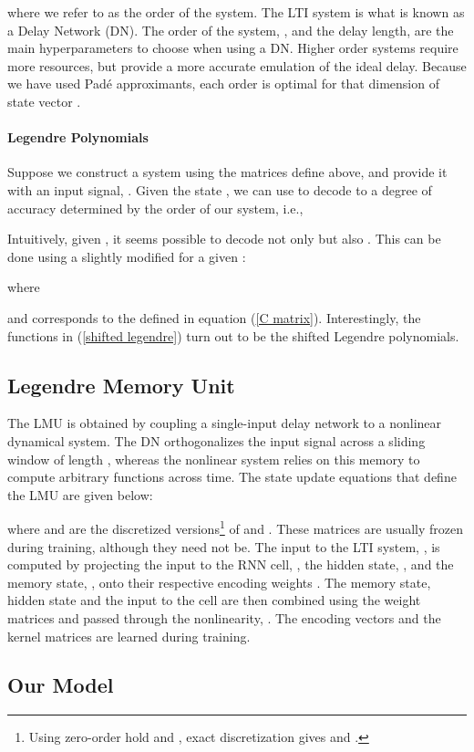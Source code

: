 \documentclass{article}
\begin{document}
where we refer to  as the order of the system. The LTI system  is what is known as a Delay Network (DN). The order of the system, , and the delay length,  are the main hyperparameters to choose when using a DN. Higher order systems require more resources, but provide a more accurate emulation of the ideal delay. Because we have used Padé approximants, each order is optimal for that dimension of state vector .

\paragraph{Legendre Polynomials} Suppose we construct a system using the  matrices define above, and provide it with an input signal, . Given the state , we can use  to decode  to a degree of accuracy determined by the order of our system, i.e.,

Intuitively, given , it seems possible to decode not only  but also .  This can be done using a slightly modified  for a given :

where 

and  corresponds to the  defined in equation (\ref{C matrix}). Interestingly, the functions in (\ref{shifted legendre}) turn out to be the shifted Legendre polynomials. 



\subsection{Legendre Memory Unit}\label{LMU section}
The LMU is obtained by coupling a single-input delay network to a nonlinear dynamical system. The DN orthogonalizes the input signal across a sliding window of length , whereas the nonlinear system relies on this memory to compute arbitrary functions across time. The state update equations that define the LMU are given below: 

where  and  are the discretized versions\footnote{Using zero-order hold and , exact discretization gives  and  .} of  and . These matrices are usually frozen during training, although they need not be. The input to the LTI system, , is computed by projecting the input to the RNN cell, , the hidden state, , and the memory state, , onto their respective encoding weights . The memory state, hidden state and the input to the cell are then combined using the weight matrices  and passed through the nonlinearity, . The encoding vectors and the kernel matrices are learned during training. 

\subsection{Our Model}\label{section_ff_LMU}
\end{document}
